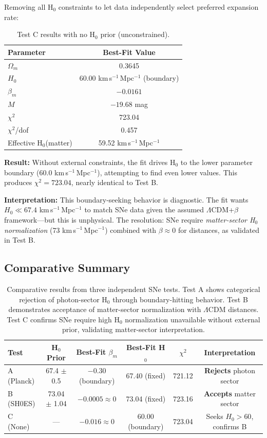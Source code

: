 \documentclass[twocolumn,superscriptaddress,prd,amsmath,amssymb]{revtex4-2}
\begin{document}
Removing all H$_0$ constraints to let data independently select preferred expansion rate:

\begin{table}[h]
\centering
\begin{tabular}{lc}
\hline\hline
Parameter & Best-Fit Value \\
\hline
$\Omega_m$ & 0.3645 \\
$H_0$ & 60.00 km\,s$^{-1}$\,Mpc$^{-1}$ (boundary) \\
$\beta_m$ & $-0.0161$ \\
$M$ & $-19.68$ mag \\
\hline
$\chi^2$ & 723.04 \\
$\chi^2$/dof & 0.457 \\
\hline
Effective H$_0$(matter) & 59.52 km\,s$^{-1}$\,Mpc$^{-1}$ \\
\hline\hline
\end{tabular}
\caption{Test C results with no H$_0$ prior (unconstrained).}
\label{tab:test_c}
\end{table}

\textbf{Result:} Without external constraints, the fit drives H$_0$ to the lower parameter boundary (60.0 km\,s$^{-1}$\,Mpc$^{-1}$), attempting to find even lower values. This produces $\chi^2 = 723.04$, nearly identical to Test B.

\textbf{Interpretation:} This boundary-seeking behavior is diagnostic. The fit wants $H_0 \ll 67.4$ km\,s$^{-1}$\,Mpc$^{-1}$ to match SNe data given the assumed $\Lambda$CDM+$\beta$ framework—but this is unphysical. The resolution: SNe require \textit{matter-sector H$_0$ normalization} (73 km\,s$^{-1}$\,Mpc$^{-1}$) combined with $\beta \approx 0$ for distances, as validated in Test B.

\subsection{Comparative Summary}

\begin{table}[t]
\centering
\begin{tabular}{lccccc}
\hline\hline
Test & H$_0$ Prior & Best-Fit $\beta_m$ & Best-Fit H$_0$ & $\chi^2$ & Interpretation \\
\hline
A (Planck) & 67.4 $\pm$ 0.5 & $-0.30$ (boundary) & 67.40 (fixed) & 721.12 & \textbf{Rejects} photon sector \\
B (SH0ES) & 73.04 $\pm$ 1.04 & $-0.0005 \approx 0$ & 73.04 (fixed) & 723.16 & \textbf{Accepts} matter sector \\
C (None) & — & $-0.016 \approx 0$ & 60.00 (boundary) & 723.04 & Seeks $H_0 > 60$, confirms B \\
\hline\hline
\end{tabular}
\caption{Comparative results from three independent SNe tests. Test A shows categorical rejection of photon-sector H$_0$ through boundary-hitting behavior. Test B demonstrates acceptance of matter-sector normalization with $\Lambda$CDM distances. Test C confirms SNe require high H$_0$ normalization unavailable without external prior, validating matter-sector interpretation.}
\label{tab:summary}
\end{table}
\end{document}
